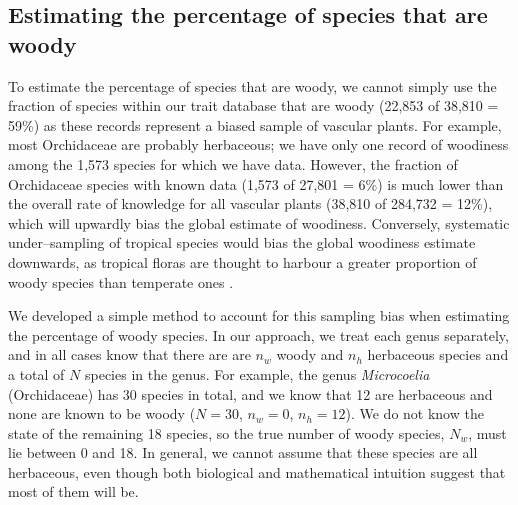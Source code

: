 \documentclass[a4paper,12pt]{article}
\begin{document}
\subsection{Estimating the percentage of species that are woody}

To estimate the percentage of species that are woody, we cannot simply
use the fraction of species within our trait database that are woody
(22,853 of 38,810 = 59\%) as these records represent a biased sample
of vascular plants.
For example, most Orchidaceae are probably herbaceous; we have only
one record of woodiness among the 1,573 species for which we have
data.
However, the fraction of Orchidaceae species with known data (1,573 of
27,801 = 6\%)
is much lower than the overall rate of knowledge for all vascular
plants (38,810 of 284,732 = 12\%), which will upwardly bias the global
estimate of woodiness.
Conversely, systematic under--sampling of tropical species would bias
the global woodiness estimate downwards, as tropical floras are
thought to harbour a greater proportion of woody species than
temperate ones \citep{Molesheihgt}.

We developed a simple method to account for this sampling bias when
estimating the percentage of woody species.  In our approach, we treat
each genus separately, and in all cases know that there are are $n_w$
woody and $n_h$ herbaceous species and a total of $N$ species in the genus.
%
For example, the genus \textit{Microcoelia} (Orchidaceae) has 30
species in total, and we know that 12 are herbaceous and none are
known to be woody ($N = 30$, $n_w = 0$, $n_h = 12$). We do not know
the state of the remaining 18 species, so the true number of woody
species, $N_w$, must lie between 0 and 18. In general, we cannot
assume that these species are all herbaceous, even though both
biological and mathematical intuition suggest that most of them will
be.
\end{document}
